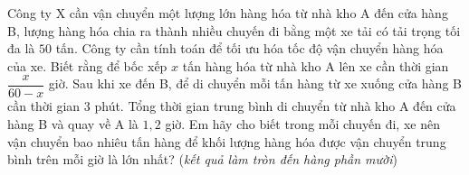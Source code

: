 \begin{bt}%
	Công ty X cần vận chuyển một lượng lớn hàng hóa từ nhà kho A đến cửa hàng B, lượng hàng hóa chia ra thành nhiều chuyến đi bằng một xe tải có tải trọng tối đa là $50$ tấn. Công ty cần tính toán để tối ưu hóa tốc độ vận chuyển hàng hóa của xe. Biết rằng để bốc xếp $x$ tấn hàng hóa từ nhà kho A lên xe cần thời gian $\dfrac{x}{60-x}$ giờ. Sau khi xe đến B, để di chuyển mỗi tấn hàng từ xe xuống cửa hàng B cần  thời gian $3$ phút. Tổng thời gian trung bình di chuyển từ nhà kho A đến cửa hàng B và quay về A là $1{,}2$ giờ. Em hãy cho biết trong mỗi chuyến đi, xe nên vận chuyển bao nhiêu tấn hàng để khối lượng hàng hóa được vận chuyển trung bình trên mỗi giờ là lớn nhất? (\textit{kết quả làm tròn đến hàng phần mười})
\end{bt}

